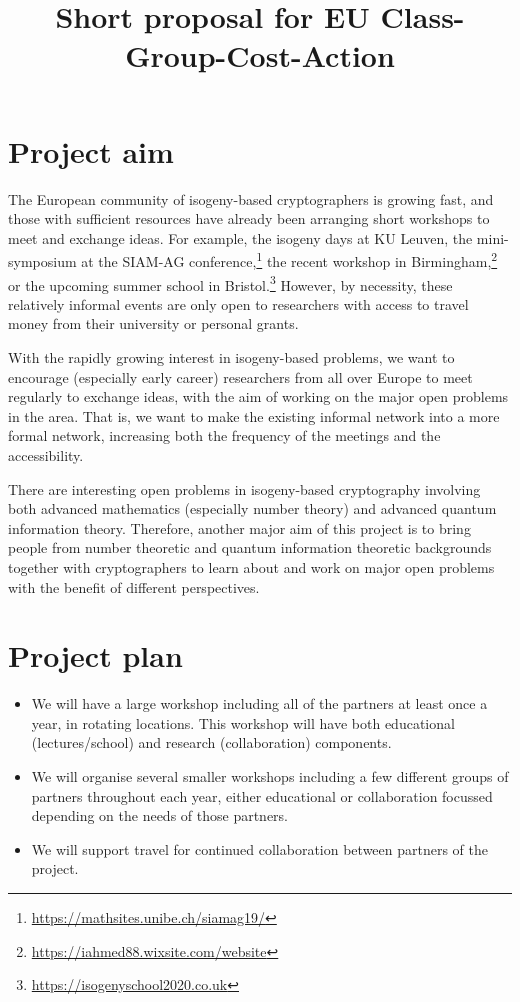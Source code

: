 \documentclass{article}
\begin{document}
\newcommand{\red}{\color{red}}

\title{Short proposal for EU Class-Group-Cost-Action}

\maketitle

\section{Project aim}

The European community of isogeny-based cryptographers is growing fast,
and those with sufficient resources have already been arranging short workshops to meet and exchange ideas.
For example, the isogeny days at KU Leuven,
the mini-symposium at the SIAM-AG conference,\footnote{
\url{https://mathsites.unibe.ch/siamag19/}}
the recent workshop in Birmingham,\footnote{
\url{https://iahmed88.wixsite.com/website}}
or the upcoming summer school in Bristol.\footnote{
\url{https://isogenyschool2020.co.uk}}
However, by necessity, these relatively informal events are only open to
researchers with access to travel money from their university or personal grants.

With the rapidly growing interest in isogeny-based problems,
we want to encourage (especially early career) researchers from all over Europe
to meet regularly to exchange ideas, 
with the aim of working on the major open problems in the area.
That is, we want to make the existing informal network into a more formal network,
increasing both the frequency of the meetings and the accessibility.

There are interesting open problems in isogeny-based cryptography 
involving both advanced mathematics (especially number theory) and advanced quantum information theory.
Therefore, another major aim of this project is to bring people from number theoretic and quantum information theoretic backgrounds together with cryptographers to learn about and work on major open problems with the benefit of different perspectives.

\section{Project plan}

\begin{itemize}
	\item We will have a large workshop including all of the partners at least once a year, in rotating locations. 
	This workshop will have both educational (lectures/school) and research (collaboration) components.
	\item We will organise several smaller workshops including a few different groups of partners throughout each year, either educational or collaboration focussed depending on the needs of those partners.
	\item We will support travel for continued collaboration between partners of the project.
\end{itemize}
\end{document}
